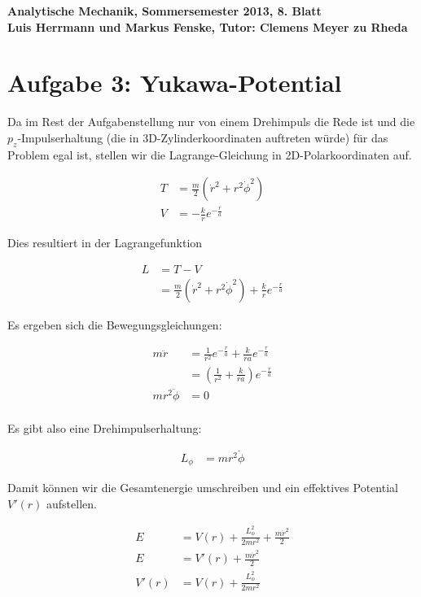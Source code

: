 \documentclass[a4paper,german,12pt,smallheadings]{scrartcl}
\begin{document}
\begin{center}
\bfseries %
\sffamily %
\vspace{-40pt}
Analytische Mechanik, Sommersemester 2013, 8. Blatt \\
Luis Herrmann und Markus Fenske, Tutor: Clemens Meyer zu Rheda
\vspace{-10pt}
\end{center}
\section*{Aufgabe 3: Yukawa-Potential}

Da im Rest der Aufgabenstellung nur von einem Drehimpuls die Rede ist und die
$p_z$-Impulserhaltung (die in 3D-Zylinderkoordinaten auftreten würde) für das
Problem egal ist, stellen wir die Lagrange-Gleichung in 2D-Polarkoordinaten
auf.

\begin{align*}
  T &= \frac{m}{2} \left(\dot{r}^2 + r^2\dot{\phi}^2\right) \\
  V &= -\frac{k}{r} e^{-\frac{r}{a}}
\end{align*}

Dies resultiert in der Lagrangefunktion

\begin{align*}
  L &= T - V \\
    &= \frac{m}{2} \left(\dot{r}^2 + r^2\dot{\phi}^2\right) + \frac{k}{r} e^{-\frac{r}{a}}
\end{align*}

Es ergeben sich die Bewegungsgleichungen:

\begin{align*}
  m\ddot{r} &= \frac{1}{r^2} e^{-\frac{r}{a}} +  \frac{k}{ra} e^{-\frac{r}{a}} \\
            &= \left(\frac{1}{r^2} + \frac{k}{ra}\right) e^{-\frac{r}{a}} \\
  mr^2\ddot{\phi} &= 0 \\
\end{align*}

Es gibt also eine Drehimpulserhaltung:

\begin{align*}
  L_{\phi} &= mr^2\dot{\phi}
\end{align*}

Damit können wir die Gesamtenergie umschreiben und ein effektives Potential
$V'(r)$ aufstellen.

\begin{align*}
  E &= V(r) + \frac{L_{\phi}^2}{2mr^2} + \frac{m\dot{r}^2}{2} \\
  E &= V'(r) + \frac{m\dot{r}^2}{2} \\
  V'(r) &= V(r) + \frac{L_{\phi}^2}{2mr^2}
\end{align*}
 
\end{document}
